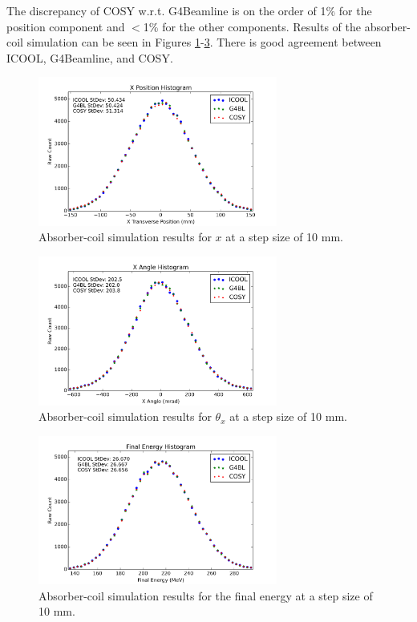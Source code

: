 The discrepancy of COSY w.r.t. G4Beamline is on the order of 1\% for the position component and $<$1\% for the other components. Results of the absorber-coil simulation can be seen in Figures \ref{fig:acx}-\ref{fig:ace}. There is good agreement between ICOOL, G4Beamline, and COSY.

\begin{figure}[H]
  \centering
    \includegraphics[width=0.7\textwidth]{MICE data/absorber coils/x} 
  \caption{Absorber-coil simulation results for $x$ at a step size of 10 mm.}
  \label{fig:acx}
\end{figure}

\begin{figure}[H]
  \centering
    \includegraphics[width=0.7\textwidth]{MICE data/absorber coils/px} 
  \caption{Absorber-coil simulation results for $\theta_x$ at a step size of 10 mm.}
  \label{fig:acpx}
\end{figure}

\begin{figure}[H]
  \centering
    \includegraphics[width=0.7\textwidth]{MICE data/absorber coils/e} 
  \caption{Absorber-coil simulation results for the final energy at a step size of 10 mm.}
  \label{fig:ace}
\end{figure}


